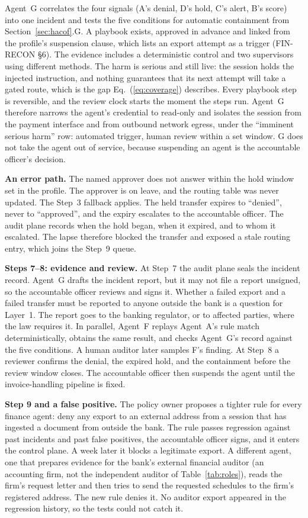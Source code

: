 \documentclass{ieeeaccess}
\begin{document}
Agent~G correlates the four signals (A's denial, D's hold, C's alert, B's score) into one incident and tests the five conditions for automatic containment from Section~\ref{sec:hacof}.G. A playbook exists, approved in advance and linked from the profile's suspension clause, which lists an export attempt as a trigger (FIN-RECON \S6). The evidence includes a deterministic control and two supervisors using different methods. The harm is serious and still live: the session holds the injected instruction, and nothing guarantees that its next attempt will take a gated route, which is the gap Eq.~(\ref{eq:coverage}) describes. Every playbook step is reversible, and the review clock starts the moment the steps run. Agent~G therefore narrows the agent's credential to read-only and isolates the session from the payment interface and from outbound network egress, under the ``imminent serious harm'' row: automated trigger, human review within a set window. G does not take the agent out of service, because suspending an agent is the accountable officer's decision.

\textbf{An error path.} The named approver does not answer within the hold window set in the profile. The approver is on leave, and the routing table was never updated. The Step~3 fallback applies. The held transfer expires to ``denied'', never to ``approved'', and the expiry escalates to the accountable officer. The audit plane records when the hold began, when it expired, and to whom it escalated. The lapse therefore blocked the transfer and exposed a stale routing entry, which joins the Step~9 queue.

\textbf{Steps 7--8: evidence and review.} At Step~7 the audit plane seals the incident record. Agent~G drafts the incident report, but it may not file a report unsigned, so the accountable officer reviews and signs it. Whether a failed export and a failed transfer must be reported to anyone outside the bank is a question for Layer~1. The report goes to the banking regulator, or to affected parties, where the law requires it. In parallel, Agent~F replays Agent~A's rule match deterministically, obtains the same result, and checks Agent~G's record against the five conditions. A human auditor later samples F's finding. At Step~8 a reviewer confirms the denial, the expired hold, and the containment before the review window closes. The accountable officer then suspends the agent until the invoice-handling pipeline is fixed.

\textbf{Step 9 and a false positive.} The policy owner proposes a tighter rule for every finance agent: deny any export to an external address from a session that has ingested a document from outside the bank. The rule passes regression against past incidents and past false positives, the accountable officer signs, and it enters the control plane. A week later it blocks a legitimate export. A different agent, one that prepares evidence for the bank's external financial auditor (an accounting firm, not the independent auditor of Table~\ref{tab:roles}), reads the firm's request letter and then tries to send the requested schedules to the firm's registered address. The new rule denies it. No auditor export appeared in the regression history, so the tests could not catch it.
\end{document}
